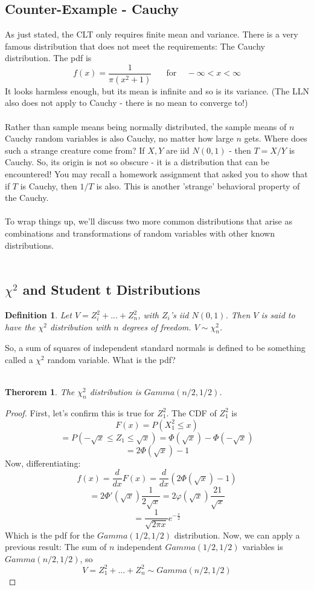 \documentclass[12pt]{article} %
\newtheorem{defn}{Definition}
\newtheorem{thm}{Therorem}
\begin{document}
\subsection{Counter-Example - Cauchy}
As just stated, the CLT only requires finite mean and variance. There is a very famous distribution that does not meet the requirements: The Cauchy distribution. The pdf is
$$f(x) = \frac{1}{\pi(x^2+1)} \;\;\;\;\;\textrm{ for } \;\;\;-\infty<x<\infty$$
It looks harmless enough, but its mean is infinite and so is its variance. (The LLN also does not apply to Cauchy - there is no mean to converge to!) \\\\
Rather than sample means being normally distributed, the sample means of $n$ Cauchy random variables is also Cauchy, no matter how large $n$ gets. Where does such a strange creature come from? If $X,Y$ are iid $N(0,1)$ - then $T=X/Y$ is Cauchy. So, its origin is not so obscure - it is a distribution that can be encountered! You may recall a homework assignment that asked you to show that if $T$ is Cauchy, then $1/T$ is also. This is another 'strange' behavioral property of the Cauchy.\\\\
To wrap things up, we'll discuss two more common distributions that arise as combinations and transformations of random variables with other known distributions.\\\\

\subsection{$\chi^2$ and Student t Distributions}
\begin{defn}
Let $V = Z_i^2+...+ Z_n^2$, with $Z_i$'s iid $N(0,1)$. Then $V$ is said to have the $\chi^2$ distribution with $n$ degrees of freedom. $V\sim\chi_n^2$.
\end{defn}
So, a sum of squares of independent standard normals is defined to be something called a $\chi^2$ random variable. What is the pdf?\\\\

\begin{thm}
The $\chi_n^2$ distribution is $Gamma(n/2,1/2)$.
\end{thm}
\begin{proof}
First, let's confirm this is true for $Z_1^2$. The CDF of $Z_1^2$ is
$$F(x) = P(X_1^2\leq x)$$
$$=P(-\sqrt{x}\leq Z_1\leq \sqrt{x}) = \Phi(\sqrt{x}) - \Phi(-\sqrt{x})$$
$$=2\Phi(\sqrt{x}) - 1$$
Now, differentiating:
$$f(x) = \frac{d}{dx}F(x) = \frac{d}{dx}\left(2\Phi(\sqrt{x}) - 1\right)$$
$$= 2\Phi'(\sqrt{x})\frac{1}{2\sqrt{x}} = 2\varphi(\sqrt{x})\frac{21}{\sqrt{x}}$$
$$=  \frac{1}{\sqrt{2\pi x}}e^{-\frac{x}{2}}$$
Which is the pdf for the $Gamma(1/2,1/2)$ distribution. Now, we can apply a previous result: The sum of $n$ independent $Gamma(1/2,1/2)$ variables is $Gamma(n/2,1/2)$, so 
$$V= Z_1^2+...+Z_n^2 \sim Gamma(n/2,1/2)$$
\end{proof}
\end{document}
